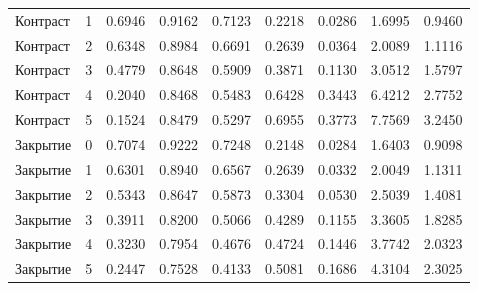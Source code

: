 \begin{table}[H]
\begin{tabular}{lrrrrrrrr}
Контраст & 1 & 0.6946 & 0.9162 & 0.7123 & 0.2218 & 0.0286 & 1.6995 & 0.9460 \\
Контраст & 2 & 0.6348 & 0.8984 & 0.6691 & 0.2639 & 0.0364 & 2.0089 & 1.1116 \\
Контраст & 3 & 0.4779 & 0.8648 & 0.5909 & 0.3871 & 0.1130 & 3.0512 & 1.5797 \\
Контраст & 4 & 0.2040 & 0.8468 & 0.5483 & 0.6428 & 0.3443 & 6.4212 & 2.7752 \\
Контраст & 5 & 0.1524 & 0.8479 & 0.5297 & 0.6955 & 0.3773 & 7.7569 & 3.2450 \\
Закрытие & 0 & 0.7074 & 0.9222 & 0.7248 & 0.2148 & 0.0284 & 1.6403 & 0.9098 \\
Закрытие & 1 & 0.6301 & 0.8940 & 0.6567 & 0.2639 & 0.0332 & 2.0049 & 1.1311 \\
Закрытие & 2 & 0.5343 & 0.8647 & 0.5873 & 0.3304 & 0.0530 & 2.5039 & 1.4081 \\
Закрытие & 3 & 0.3911 & 0.8200 & 0.5066 & 0.4289 & 0.1155 & 3.3605 & 1.8285 \\
Закрытие & 4 & 0.3230 & 0.7954 & 0.4676 & 0.4724 & 0.1446 & 3.7742 & 2.0323 \\
Закрытие & 5 & 0.2447 & 0.7528 & 0.4133 & 0.5081 & 0.1686 & 4.3104 & 2.3025 \\
\bottomrule
\end{tabular}
\end{table}

